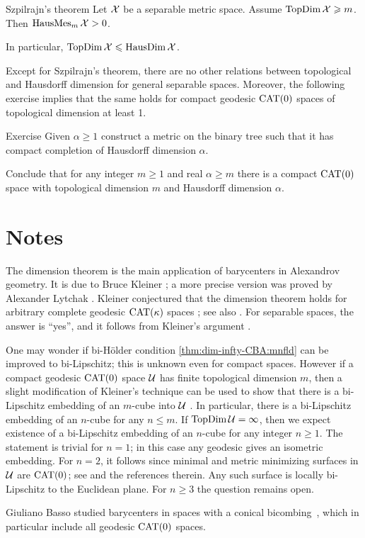 \begin{thm}{Szpilrajn's theorem}\label{thm:szpilrajn} 
Let $\mathcal{X}$ be a separable metric space.
Assume $\mathop{\rm TopDim}\nolimits\mathcal{X}\geqslant m$.
Then $\mathop{\rm HausMes}\nolimits_m \mathcal{X}>0$.

In particular, 
$\mathop{\rm TopDim}\nolimits\mathcal{X}\leqslant\mathop{\rm HausDim}\nolimits\mathcal{X}$.
\end{thm}

{\sloppy

Except for Szpilrajn's theorem, there are no other relations between topological and Hausdorff dimension for general separable spaces.
Moreover, the following exercise implies that the same holds for compact geodesic $\mathrm{CAT}(0)$ spaces of topological dimension at least 1.

}

\begin{thm}{Exercise}\label{ex:dim-top-haus-CAT}
Given $\alpha\ge 1$ construct a metric on the binary tree such that it has compact completion of Hausdorff dimension $\alpha$.

Conclude that for any integer $m\ge 1$ and real $\alpha\ge m$ there is a compact $\mathrm{CAT}(0)$ space with topological dimension $m$ and Hausdorff dimension $\alpha$. 
\end{thm}


\section{Notes}

The dimension theorem is the main application of barycenters in Alexandrov geometry.
It is due to Bruce Kleiner \cite{kleiner-1999};
a more precise version was proved by Alexander Lytchak \cite{lytchak:diff}.
Kleiner conjectured that the dimension theorem holds for arbitrary complete geodesic $\mathrm{CAT}(\kappa)$ spaces \cite{kleiner-1999}; see also \cite[p.~133]{gromov-1993}.
For separable spaces, the answer is ``yes'', and it follows from Kleiner's argument \cite[Corollary 14.13]{alexander-kapovitch-petrunin-2025}.

One may wonder if bi-H\"older condition \ref{thm:dim-infty-CBA:mnfld} can be improved to bi-Lipschitz;
this is unknown even for compact spaces.
However if a compact geodesic $\mathrm{CAT}(0)$ space $\mathcal{U}$ has finite topological dimension $m$,
then a slight modification of Kleiner's technique can be used to show that there is a bi-Lipschitz embedding of an $m$-cube into $\mathcal{U}$ \cite[Theorem 14.15]{alexander-kapovitch-petrunin-2025}.
In particular, there is a bi-Lipschitz embedding of an $n$-cube for any $n\le m$.
If $\mathop{\rm TopDim}\nolimits\mathcal{U}=\infty$, then we expect existence of a bi-Lipschitz embedding of an $n$-cube for any integer $n\ge1$.
The statement is trivial for $n=1$; in this case any geodesic gives an isometric embedding.
For $n=2$, it follows since minimal and metric minimizing surfaces in $\mathcal{U}$ are $\mathrm{CAT}(0)$;
see \cite{petrunin-stadler} and the references therein.
Any such surface is locally bi-Lipschitz to the Euclidean plane.
For $n\ge 3$ the question remains open.

Giuliano Basso studied barycenters in spaces with a conical bicombing~\cite{basso}, which in particular include all geodesic $\mathrm{CAT}(0)$ spaces.

